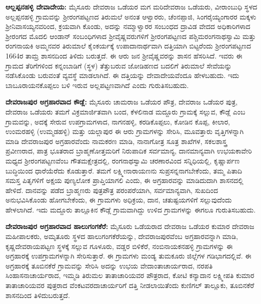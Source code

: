 \textbf{ಆಲ್ಲಪ್ಪನಹಳ್ಳಿ ದೇವಾದೇಯ:} ಮೈಸೂರು ದೇವರಾಜ ಒಡೆಯರ ಮಗ ಮರಿದೇವರಾಜ ಒಡೆಯರು, ವೀರಾಂಬುಧಿ ಸ್ಥಳದ ಅಲ್ಲಪ್ಪನಹಳ್ಳಿ ಗ್ರಾಮವನ್ನು ಶ‍್ರೀರಂಗಪಟ್ಟಣದ ತಿರುಮಲೆ ಅನಂತ ಆಳ್ವಾರರು, ಚೆಂನಪ್ಪಾಜಿ, ಸಿಂಗರೈಯ್ಯಂಗಾರರ ಮಕ್ಕಳು ಶ‍್ರೀನಿವಾಸಯ್ಯನವರಿಂದ, ಕ್ರಯವಾಗಿ ಕೊಂಡು, ಅದನ್ನು ನಮ್ಮಾಳ್ವಾರರ ಸಂಬಂಧದ ದ್ರಾವಿಡ ವೇದದ ಅಧಿಕಾರಿಗಳಾದ ಶ‍್ರೀರಂಗದ ಮೊದಲಿ ಆಂಡಾನ್​ ಸಂಬಂಧಿಗಳಾದ ಶ‍್ರೀವೈಷ್ಣವರುಗಳಿಗೆ ಶ‍್ರೀರಂಗಪಟ್ಟಣದ ಪಶ್ಚಿಮರಂಗನಾಥ\-ಸ್ವಾಮಿ ಮತ್ತು ರಂಗನಾಯಕಿ ಅಮ್ಮನವರ ತಿರುಮಾಲೆ ಕೈಂಕರ್ಯಕ್ಕೆ ಉಪಾದಾನಾರ್ಥವಾಗಿ ದತ್ತಿಯಾಗಿ ಬಿಟ್ಟರೆಂದು ಶ‍್ರೀರಂಗಪಟ್ಟಣದ 1664ರ ತಾಮ್ರ ಶಾಸನದಿಂದ ತಿಳಿದು ಬರುತ್ತದೆ. ಈ ಆರು ಜನ ಶ‍್ರೀವೈಷ್ಣವರನ್ನು ಶಾಸನ ಹೆಸರಿಸಿದೆ. ಇವರು ಈ ಗ್ರಾಮದ ತೆರಿಗೆಗಳಿಂದ ಕನ್ನಂಬಾಡಿಗೆ (ಸ್ಥಳ) ತೆತ್ತುಬರುವ ಜೋಡಿಹಣದ ಬದಲಿಗೆ ತಿರುಮಾಲೆ ಸೇವೆಯನ್ನು ನಡೆಸಿಕೊಂಡು ಬರುವಂತೆ ವ್ಯವಸ್ಥೆ ಮಾಡಲಾಗಿದೆ. ಈ ದತ್ತಿಯನ್ನು ದೇವಾದೇಯವೆಂದೂ ಹೇಳಬಹುದು. ಇದು ಬಾಬೂರಾಯನಕೊಪ್ಪಲು ಬಳಿ ಇರುವ ಅಲ್ಲಪಟ್ಟಣವಾಗಿದೆ ಎಂದು ಗುರುತಿಸಬಹುದು.

\textbf{ದೇವರಾಜಪುರ ಅಗ್ರಹಾರವಾದ ಕೌಡ್ಲೆ:} ಮೈಸೂರು ಚಾಮರಾಜ ಒಡೆಯರ ಪೌತ್ರ, ದೇವರಾಜ ಒಡೆಯರ ಪುತ್ರ, ದೇವರಾಜ ಒಡೆಯರು ತಮಗೆ ವಿಕ್ರಮಾರ್ಜಿತವಾಗಿ ಬಂದ, ಕೆಳಲಿನಾಡ ಮದ್ದೂರು ಗ್ರಾಮಕ್ಕೆ ಸಲ್ಲುವ, ಕೌಡ್ಲೆ ಎಂಬ ಗ್ರಾಮವನ್ನು, ಅದಕ್ಕೆ ಸೇರುವ ಉಪಗ್ರಾಮಗಳಾದ, ನಾಗನಹಳ್ಳಿ, ಕರಡಿಕೊಪ್ಪಲು, ಕೋಡಿನ ಕೊಪ್ಪ, ಕೀಲಾರ, ಉಂಮರಹಳ್ಳಿ (ಉಮ್ಮಡಹಳ್ಳಿ) ಮತ್ತು ಯಲ್ಲಾಪುರ ಈ ಆರು ಗ್ರಾಮಗಳನ್ನು ಸೇರಿಸಿ, ಮೂವತ್ತಾರು ವೃತ್ತಿಗಳನ್ನಾಗಿ ಮಾಡಿ ದೇವರಾಜಪುರ ಅಗ್ರಹಾರವೆಂದು ನಾಮಕರಣ ಮಾಡಿ, ನಾನಾಗೋತ್ರ ಸೂತ್ರ ಶಾಖೆಗಳ, ಸಕಲಶಾಸ್ತ್ರ ಪ್ರವೀಣರಾದ, ಪಾತ್ರ ಭೂತರಾದ ಬ್ರಾಹ್ಮಣೋತ್ತಮರಿಗೆ ನಿರುಪಾದಿಕ ಸರ್ವಮಾನ್ಯ, ದಾನಮಾನ್ಯವಾಗಿ ಉಭಯಕಾವೇರಿ ಮಧ್ಯದ ಶ‍್ರೀರಂಗಪಟ್ಟಣವೆಂಬ ಗೌತಮಕ್ಷೇತ್ರದಲ್ಲಿ, ರಂಗನಾಥಸ್ವಾಮಿ ಚರಣಾರವಿಂದ ಸನ್ನಿಧಿಯಲ್ಲಿ, ಕೃಷ್ಣಾರ್ಪಣ ಬುದ್ಧಿಯಿಂದ ಧಾರೆಯೆರೆದು ಕೊಡುತ್ತಾರೆ. ತಮಗೆ ಲಕ್ಷ್ಮೀನಾರಾಯಣನು ಸುಪ್ರಸನ್ನನಾಗಬೇಕೆಂದು, ತಮ್ಮ ಪಿತಾದಿ ಸಮಸ್ತ ಪಿತೃಗಳಿಗೆ ಅಕ್ಷಯ ಪುಣ್ಯಲೋಕ ಪ್ರಾಪ್ತಿಯಾಗಲಿ ಎಂದು, ಈ ಅಗ್ರಹಾರವನ್ನು ಮಾಡಿದುದಾಗಿ ಶಾಸನದಲ್ಲಿ ಹೇಳಿದೆ. ದಾನವನ್ನು ಪಡೆದ ಬ್ರಾಹ್ಮಣರು ಪುತ್ರಪೌತ್ರ ಪರಂಪರೆಯಾಗಿ, ಸರ್ವಮಾನ್ಯವಾಗಿ, ಸುಖದಿಂದ ಅನುಭವಿಸಿಕೊಂಡು ಹೋಗಬೇಕೆಂದು, ಈ ಗ್ರಾಮಗಳು ಅಧಿಕ್ರಯ, ದಾನ, ಚತುಷ್ಟಯಗಳಿಗೆ ಸಲ್ಲುವುದೆಂದು ಹೇಳಲಾಗಿದೆ. ಇದು ಮದ್ದೂರು ತಾಲ್ಲೂಕಿನ ಕೌಡ್ಲೆ ಗ್ರಾಮವಾಗಿದ್ದು ಉಳಿದ ಗ್ರಾಮಗಳನ್ನು ಈಗಲೂ ಗುರುತಿಸಬಹುದು.

\textbf{ದೇವರಾಜಪುರ ಅಗ್ರಹಾರವಾದ \enginline{-} ಹಾಲುಗಂಗಕೆರೆ:} ಮೈಸೂರು ಒಡೆಯರಾದ ದೇವರಾಜ ಒಡೆಯರ ಕುಮಾರ ದೇವರಾಜ ಮಹೀಪಾಲಕರು, ಅಮೃತೂರು ಸ್ಥಳದ ಹಾಲುಗಂಗಕೆರೆಯನ್ನು, ದೇವರಾಜಪುರವೆಂಬ ಅಗ್ರಹಾರವನ್ನಾಗಿ ಮಾಡಿ, ಕೃಷ್ಣದೇವರಾಯಪಟ್ಟಣ ಸ್ಥಳಕ್ಕೆ ಸಲ್ಲುವ ಗೂಳೂರು, ವಡ್ಡರ ಬಿಳಿಕೆರೆ, ನಂಬಿನಾಯಕನಹಳ್ಳಿ ಗ್ರಾಮಗಳನ್ನು ಈ ಅಗ್ರಹಾರಕ್ಕೆ ಉಪಗ್ರಾಮಗಳನ್ನಾಗಿ ಸೇರಿಸುತ್ತಾರೆ. ಈ ಗ್ರಾಮಗಳು ಮಂಡ್ಯ ತುಮಕೂರು ಜಿಲ್ಲೆಗಳ ಗಡಿಭಾಗದಲ್ಲಿವೆ. ಈ ಅಗ್ರಹಾರಕ್ಕೆ ತೂಬಿನಕೆರೆ ಗ್ರಾಮವನ್ನು ಸೇರಿಸಿ ಅದನ್ನು ಉಭಯ ವೇದಾಂತಾಚಾರ್ಯರಾದ, ನರಪತಿ ಸಿಂಹಾಸನಾಚಾರ್ಯರಾದ, ಇಮ್ಮಡಿ ತಿರುಮಲ ತಾತಾಚಾರಿಯವರ ಪೌತ್ರರಾದ, ಕೋಟಿ ಕನ್ಯಾದಾನ ಲಕ್ಷ್ಮೀಪತಿ ಕುಮಾರ ತಾತಾಚಾರಿಯವರ ಪುತ್ರರಾದ ವೆಂಕಟ\-ವರದಾಚಾರ್ಯರಿಗೆ ದತ್ತಿ ನೀಡಲಾಯಿತೆಂದು ಕುಣಿಗಲ್​ ತಾಲ್ಲೂಕು, ತೂಬಿನಕೆರೆ ಶಾಸನದಿಂದ ತಿಳಿದುಬರುತ್ತದೆ.

